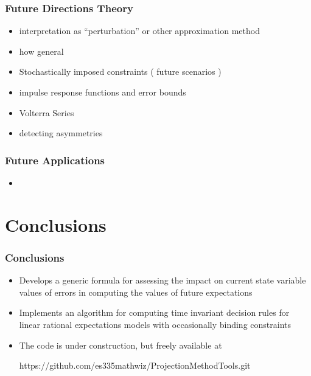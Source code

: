 \documentclass{beamer}
\begin{document}
  \begin{frame}
    \frametitle{Future Directions Theory}
    \begin{itemize}
\item interpretation as ``perturbation'' or other approximation method
\item how general
\item Stochastically imposed constraints ( future scenarios )
\item impulse response functions and error bounds
\item Volterra Series
\item detecting asymmetries
    \end{itemize}
  \end{frame}
  \begin{frame}
  \frametitle{Future Applications}
    \begin{itemize}
\item
    \end{itemize}
  \end{frame}




    \section{Conclusions}

  \begin{frame}
    \frametitle{Conclusions}
    \begin{itemize}
\item Develops a generic formula  for assessing the impact on current state variable values of errors in computing the values of future expectations
    \item Implements an algorithm for computing time invariant 
decision rules for linear rational expectations models with occasionally binding constraints
\item The code is under construction, but freely available at 

https://github.com/es335mathwiz/ProjectionMethodTools.git
    \end{itemize}
  \end{frame}
\end{document}
